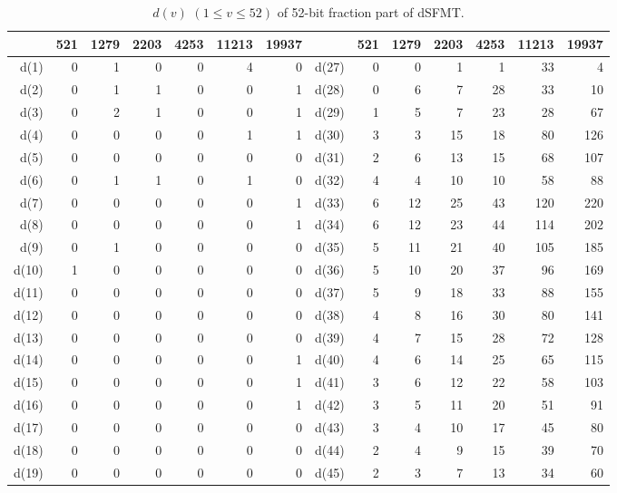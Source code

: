 \documentclass{svmult}
\begin{document}
\begin{table}
  \begin{center}
    \caption{$d(v)$ $(1 \leq v \leq 52)$ of 52-bit fraction part of dSFMT.}
    \label{tab:dd}
    \begin{tabular}{|r|rrrrrr||r|rrrrrr|} \hline
      & 521 & 1279 & 2203 & 4253 & 11213 & 19937 
      & & 521 & 1279 & 2203 & 4253 & 11213 & 19937 \\ \hline
      d(1) & 0 & 1 & 0 & 0 & 4 & 0 & d(27) & 0 & 0 & 1 & 1 & 33 & 4 \\
      d(2) & 0 & 1 & 1 & 0 & 0 & 1 & d(28) & 0 & 6 & 7 & 28 & 33 & 10 \\
      d(3) & 0 & 2 & 1 & 0 & 0 & 1 & d(29) & 1 & 5 & 7 & 23 & 28 & 67 \\
      d(4) & 0 & 0 & 0 & 0 & 1 & 1 & d(30) & 3 & 3 & 15 & 18 & 80 & 126 \\
      d(5) & 0 & 0 & 0 & 0 & 0 & 0 & d(31) & 2 & 6 & 13 & 15 & 68 & 107 \\
      d(6) & 0 & 1 & 1 & 0 & 1 & 0 & d(32) & 4 & 4 & 10 & 10 & 58 & 88 \\
      d(7) & 0 & 0 & 0 & 0 & 0 & 1 & d(33) & 6 & 12 & 25 & 43 & 120 & 220 \\
      d(8) & 0 & 0 & 0 & 0 & 0 & 1 & d(34) & 6 & 12 & 23 & 44 & 114 & 202 \\
      d(9) & 0 & 1 & 0 & 0 & 0 & 0 & d(35) & 5 & 11 & 21 & 40 & 105 & 185 \\
      d(10) & 1 & 0 & 0 & 0 & 0 & 0 & d(36) & 5 & 10 & 20 & 37 & 96 & 169 \\
      d(11) & 0 & 0 & 0 & 0 & 0 & 0 & d(37) & 5 & 9 & 18 & 33 & 88 & 155 \\
      d(12) & 0 & 0 & 0 & 0 & 0 & 0 & d(38) & 4 & 8 & 16 & 30 & 80 & 141 \\
      d(13) & 0 & 0 & 0 & 0 & 0 & 0 & d(39) & 4 & 7 & 15 & 28 & 72 & 128 \\
      d(14) & 0 & 0 & 0 & 0 & 0 & 1 & d(40) & 4 & 6 & 14 & 25 & 65 & 115 \\
      d(15) & 0 & 0 & 0 & 0 & 0 & 1 & d(41) & 3 & 6 & 12 & 22 & 58 & 103 \\
      d(16) & 0 & 0 & 0 & 0 & 0 & 1 & d(42) & 3 & 5 & 11 & 20 & 51 & 91 \\
      d(17) & 0 & 0 & 0 & 0 & 0 & 0 & d(43) & 3 & 4 & 10 & 17 & 45 & 80 \\
      d(18) & 0 & 0 & 0 & 0 & 0 & 0 & d(44) & 2 & 4 & 9 & 15 & 39 & 70 \\
      d(19) & 0 & 0 & 0 & 0 & 0 & 0 & d(45) & 2 & 3 & 7 & 13 & 34 & 60 \\

\end{tabular}
\end{center}
\end{table}
\end{document}
